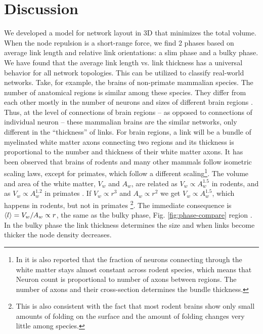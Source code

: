 \documentclass[nofootinbib,preprint,endfloats]{revtex4} %
\newcommand{\RNum}[1]{\uppercase\expandafter{\romannumeral #1\relax}}
\begin{document}
\section{Discussion}
We developed a model for network layout in 3D that minimizes the total volume. 
When the node repulsion is a short-range force, we find 2 phases based on average link length and relative link orientations: a slim phase and a bulky phase. We have found that the average link length vs. link thickness has a universal behavior for all network topologies. This can be utilized to classify real-world networks. Take, for example, the brains of non-primate mammalian species. The number of anatomical regions is similar among these species. They differ from each other mostly in the number of neurons and sizes of different brain regions \cite{azevedo2009equal, herculano2012remarkable, herculano2014brain}. Thus, at the level of connections of brain regions -- as opposed to connections of individual neuron -- these mammalian brains are the similar networks, only different in the ``thickness'' of links. 
For brain regions, a link will be a bundle of myelinated white matter axons connecting two regions and its thickness is proportional to the number and thickness of their white matter axons. 
It has been observed that brains of rodents \cite{herculano2012remarkable} and many other mammals \cite{herculano2014brain} follow isometric scaling laws, except for primates, which follow a different scaling\footnote{In \cite{herculano2012remarkable} it is also reported that the fraction of neurons connecting through the white matter stays almost constant across rodent species, which means that Neuron count is proportional to number of axons between regions. The number of axons and their cross-section determines the bundle thickness.}. 
The volume and area of the white matter, $V_w$ and $A_w$, are related as $V_w\propto A_w^{1.5}$ in rodents, and as $V_w \propto A_w^{1.2}$ in primates  \cite{herculano2012remarkable}. 
If $V_w \propto r^3$ and $A_w \propto r^2$ we get $V_w \propto A_w^{1.5}$, which happens in rodents, but not in primates 
\footnote{This is also consistent with the fact that most rodent brains show only small amounts of folding on the surface and the amount of folding changes very little among species.}.
The immediate consequence is $ \left<l\right> = V_w/A_w \propto r $, the same as the bulky phase, Fig. \ref{fig:phase-compare} region \RNum{3}. 
In the bulky phase the link thickness determines the size and when links become thicker the node density decreases. 
\end{document}
